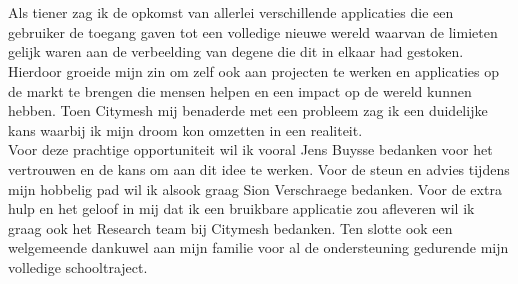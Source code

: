 
\chapter*{}%
\label{ch:voorwoord}


Als tiener zag ik de opkomst van allerlei verschillende applicaties die een gebruiker de toegang gaven tot een volledige nieuwe wereld waarvan de limieten gelijk waren aan de verbeelding van degene die dit in elkaar had gestoken. Hierdoor groeide mijn zin om zelf ook aan projecten te werken en applicaties op de markt te brengen die mensen helpen en een impact op de wereld kunnen hebben. Toen Citymesh mij benaderde met een probleem zag ik een duidelijke kans waarbij ik mijn droom kon omzetten in een realiteit. \\

Voor deze prachtige opportuniteit wil ik vooral Jens Buysse bedanken voor het vertrouwen en de kans om aan dit idee te werken. Voor de steun en advies tijdens mijn hobbelig pad wil ik alsook graag Sion Verschraege bedanken. Voor de extra hulp en het geloof in mij dat ik een bruikbare applicatie zou afleveren wil ik graag ook het Research team bij Citymesh bedanken. Ten slotte ook een welgemeende dankuwel aan mijn familie voor al de ondersteuning gedurende mijn volledige schooltraject.